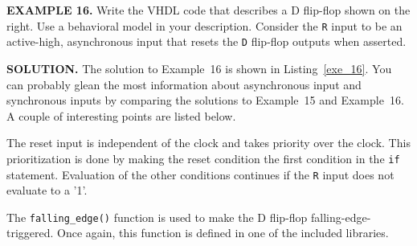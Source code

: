 \begin{leftbar}
\begin{minipage}{0.5\linewidth}
\noindent
\textbf{EXAMPLE 16.}
Write the VHDL code that describes a D flip-flop shown on the right. Use a behavioral model in your description. Consider the \texttt{R} input to be an active-high, asynchronous input that resets the \texttt{D} flip-flop outputs when asserted.
\end{minipage}
\begin{minipage}{0.47\linewidth}
\begin{flushright}
\end{flushright}
\end{minipage}
\end{leftbar}
\noindent
\textbf{SOLUTION.} The solution to Example~16 is shown in Listing~\ref{exe_16}. You can probably glean the most information about asynchronous input and synchronous inputs by comparing the solutions to Example~15 and Example~16. A couple of interesting points are listed below. 
\begin{my_list}
\item The reset input is independent of the clock and takes priority over the clock. This prioritization is done by making the reset condition the first condition in the \texttt{if} statement. Evaluation of the other conditions continues if the \texttt{R} input does not evaluate to a '1'.
\item The \texttt{falling\_edge()} function is used to make the D flip-flop falling-edge-triggered. Once again, this function is defined in one of the included libraries. 
\end{my_list}

